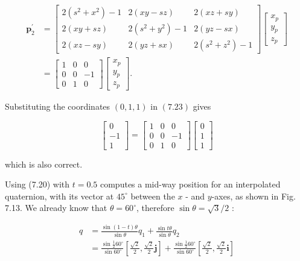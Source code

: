 $$
\begin{aligned}
\mathbf{p}_{2}^{\prime} & =\left[\begin{array}{ccc}
2\left(s^{2}+x^{2}\right)-1 & 2(x y-s z) & 2(x z+s y) \\
2(x y+s z) & 2\left(s^{2}+y^{2}\right)-1 & 2(y z-s x) \\
2(x z-s y) & 2(y z+s x) & 2\left(s^{2}+z^{2}\right)-1
\end{array}\right]\left[\begin{array}{l}
x_{p} \\
y_{p} \\
z_{p}
\end{array}\right] \\
& =\left[\begin{array}{ccc}
1 & 0 & 0 \\
0 & 0 & -1 \\
0 & 1 & 0
\end{array}\right]\left[\begin{array}{c}
x_{p} \\
y_{p} \\
z_{p}
\end{array}\right] .
\end{aligned}
$$

Substituting the coordinates $(0,1,1)$ in $(7.23)$ gives

$$
\left[\begin{array}{c}
0 \\
-1 \\
1
\end{array}\right]=\left[\begin{array}{ccc}
1 & 0 & 0 \\
0 & 0 & -1 \\
0 & 1 & 0
\end{array}\right]\left[\begin{array}{l}
0 \\
1 \\
1
\end{array}\right]
$$

which is also correct.

Using (7.20) with $t=0.5$ computes a mid-way position for an interpolated quaternion, with its vector at $45^{\circ}$ between the $x$ - and $y$-axes, as shown in Fig. 7.13. We already know that $\theta=60^{\circ}$, therefore $\sin \theta=\sqrt{3} / 2$ :

$$
\begin{aligned}
q & =\frac{\sin (1-t) \theta}{\sin \theta} q_{1}+\frac{\sin t \theta}{\sin \theta} q_{2} \\
& =\frac{\sin \frac{1}{2} 60^{\circ}}{\sin 60^{\circ}}\left[\frac{\sqrt{2}}{2}, \frac{\sqrt{2}}{2} \mathbf{j}\right]+\frac{\sin \frac{1}{2} 60^{\circ}}{\sin 60^{\circ}}\left[\frac{\sqrt{2}}{2}, \frac{\sqrt{2}}{2} \mathbf{i}\right]
\end{aligned}
$$

